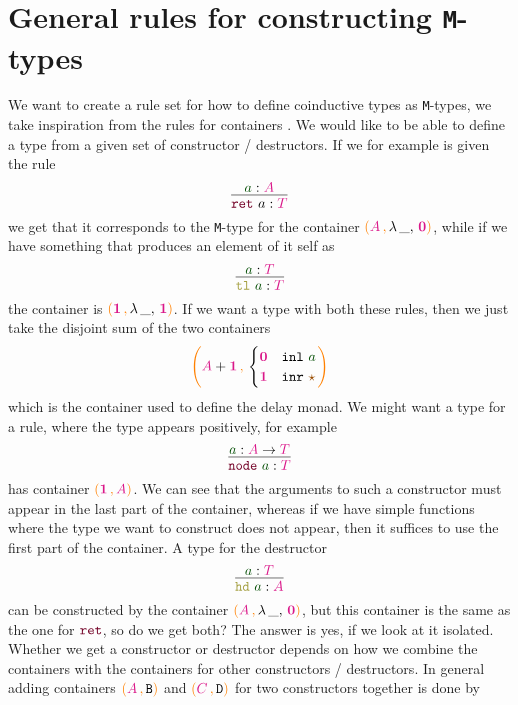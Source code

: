 \documentclass[twoside,11pt,openright]{report}
\theoremstyle{plain} %
\theoremstyle{definition}
\theoremstyle{remark}
\newcommand*{\term}[1]{\textcolor{green!30!black}{#1}} %
\newcommand*{\type}[1]{\textcolor{magenta!90!black}{#1}}
\newcommand*{\containerpair}[2]{\ensuremath{\colorlet{savedleftcolor}{.}\color{orange}\left(\color{savedleftcolor}#1\,\textcolor{orange}{\mathbf{,}}\,#2\color{orange}\right)\color{savedleftcolor}}}
\newcommand*{\containerpairsimple}[2]{\containerpair{#1}{\lambda\,\_,\,#2}}
\newcommand*{\unit}{\type{\textbf{1}}}
\newcommand*{\empt}{\type{\textbf{0}}}
\newcommand*{\constant}[1]{\textcolor{orange!60!black}{\ensuremath{\mathtt{#1}}}}
\newcommand*{\constructor}[1]{\textcolor{purple!60!black}{\ensuremath{\mathtt{#1}}}}
\newcommand*{\destructor}[1]{\textcolor{yellow!60!black}{\ensuremath{\mathtt{#1}}}}
\newcommand*{\typeformer}[1]{\ensuremath{\mathtt{#1}}}
\newcommand*{\unitelem}{\constant{\star}} %
\begin{document}
\section{General rules for constructing \texttt{M}-types}
We want to create a rule set for how to define coinductive types as \texttt{M}-types, we take inspiration from the rules for containers \cite{DBLP:DiffContainer}\cite{ContainerRules}. We would like to be able to define a type from a given set of constructor / destructors. If we for example is given the rule
\begin{equation}
  \vcenter{\infer{\constructor{ret}~a : \type{T}}{\term{a} : \type{A}}}
\end{equation}
we get that it corresponds to the \texttt{M}-type for the container \(\containerpairsimple{\type{A}}{\empt}\), while if we have something that produces an element of it self as
\begin{equation}
  \vcenter{\infer{\destructor{tl}~\term{a} : \type{T}}{\term{a} : \type{T}}}
\end{equation}
the container is \(\containerpairsimple{\unit}{\unit}\). If we want a type with both these rules, then we just take the disjoint sum of the two containers
\begin{equation}
  \containerpair{\type{A} + \unit}{\begin{cases} \empt & \mathtt{inl}~\term{a} \\ \unit & \mathtt{inr}~\unitelem \end{cases}}
\end{equation}
which is the container used to define the delay monad. We might want a type for a rule, where the type appears positively, for example
\begin{equation}
  \vcenter{\infer{\constructor{node}~\term{a} : \type{T}}{\term{a} : \type{A} \rightarrow \type{T}}}
\end{equation}
has container \(\containerpair{\unit}{\type{A}}\). We can see that the arguments to such a constructor must appear in the last part of the container, whereas if we have simple functions where the type we want to construct does not appear, then it suffices to use the first part of the container. A type for the destructor
\begin{equation}
  \vcenter{\infer{\destructor{hd}~\term{a} : \type{A}}{\term{a} : \type{T}}}
\end{equation}
can be constructed by the container \(\containerpairsimple{\type{A}}{\empt}\), but this container is the same as the one for \(\constructor{ret}\), so do we get both? The answer is yes, if we look at it isolated. Whether we get a constructor or destructor depends on how we combine the containers with the containers for other constructors / destructors. In general adding containers \(\containerpair{\type{A}}{\typeformer{B}}\) and \(\containerpair{\type{C}}{\typeformer{D}}\) for two constructors together is done by
\end{document}
